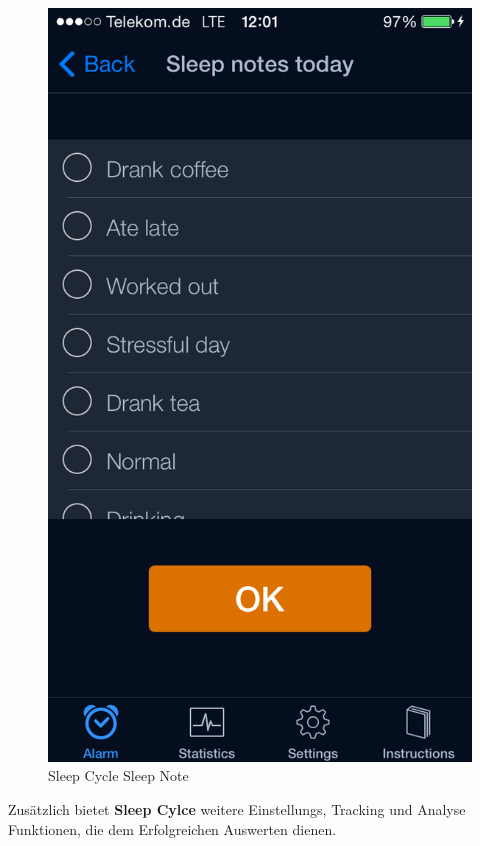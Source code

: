 \begin{figure}[htbp]
\begin{minipage}[b]{0.47\textwidth}
    \includegraphics[scale=0.3]{images/SleepCycle/SleepNotesToday}  
    \caption{Sleep Cycle Sleep Note}
    \label{fig:SCSleepNoteToday}
  \end{minipage}
\end{figure}

Zusätzlich bietet \textbf{Sleep Cylce} weitere Einstellungs, Tracking und Analyse Funktionen, die dem Erfolgreichen Auswerten dienen.



